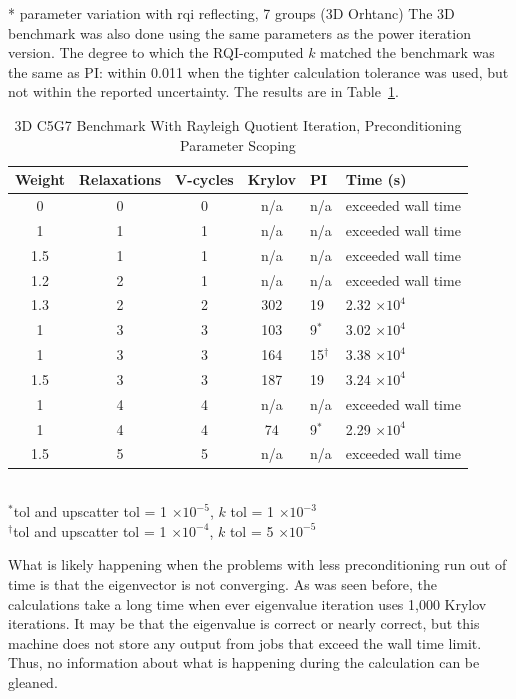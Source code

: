 * parameter variation with rqi reflecting, 7 groups (3D Orhtanc)
The 3D benchmark was also done using the same parameters as the power iteration version. The degree to which the RQI-computed $k$ matched the benchmark was the same as PI: within 0.011 when the tighter calculation tolerance was used, but not within the reported uncertainty. The results are in Table~\ref{table:3D c5g7 rqi}.
%
\begin{table}[!h]
\caption{3D C5G7 Benchmark With Rayleigh Quotient Iteration, Preconditioning Parameter Scoping}
\begin{center}
\begin{tabular}{c c c c l l}
\hline
Weight & Relaxations & V-cycles & Krylov & PI & Time (s) \\[0.5ex]
\hline
0    & 0 & 0 & n/a     & n/a          & exceeded wall time \\
1    & 1 & 1 & n/a     & n/a          & exceeded wall time \\
1.5 & 1 & 1 & n/a     & n/a          & exceeded wall time \\
1.2 & 2 & 1 & n/a     & n/a          & exceeded wall time \\
1.3 & 2 & 2 & 302    & 19           & 2.32 $\times 10^{4}$ \\
1    & 3 & 3 & 103    & 9$^{*}$    & 3.02 $\times 10^{4}$ \\
1    & 3 & 3 & 164    & 15$^{\dagger}$ & 3.38 $\times 10^{4}$ \\
1.5 & 3 & 3 & 187    & 19           & 3.24 $\times 10^{4}$ \\
1    & 4 & 4 & n/a     & n/a          & exceeded wall time \\
1    & 4 & 4 & 74     & 9$^{*}$    & 2.29 $\times 10^{4}$ \\
1.5 & 5 & 5 & n/a     & n/a          & exceeded wall time \\
\hline 
\end{tabular}\\
$^{*}$tol and upscatter tol = 1 $\times 10^{-5}$, $k$ tol = 1 $\times 10^{-3}$\\
$^{\dagger}$tol and upscatter tol = 1 $\times 10^{-4}$, $k$ tol = 5 $\times 10^{-5}$
\end{center}
\label{table:3D c5g7 rqi}
\end{table}  

What is likely happening when the problems with less preconditioning run out of time is that the eigenvector is not converging. As was seen before, the calculations take a long time when ever eigenvalue iteration uses 1,000 Krylov iterations. It may be that the eigenvalue is correct or nearly correct, but this machine does not store any output from jobs that exceed the wall time limit. Thus, no information about what is happening during the calculation can be gleaned. 

